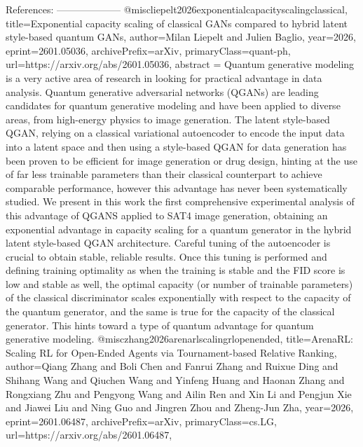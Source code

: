         References:
        --------------------
        @misc{liepelt2026exponentialcapacityscalingclassical,
      title={Exponential capacity scaling of classical GANs compared to hybrid latent style-based quantum GANs}, 
      author={Milan Liepelt and Julien Baglio},
      year={2026},
      eprint={2601.05036},
      archivePrefix={arXiv},
      primaryClass={quant-ph},
      url={https://arxiv.org/abs/2601.05036},
      abstract = {Quantum generative modeling is a very active area of research in looking for practical advantage in data analysis. Quantum generative adversarial networks (QGANs) are leading candidates for quantum generative modeling and have been applied to diverse areas, from high-energy physics to image generation. The latent style-based QGAN, relying on a classical variational autoencoder to encode the input data into a latent space and then using a style-based QGAN for data generation has been proven to be efficient for image generation or drug design, hinting at the use of far less trainable parameters than their classical counterpart to achieve comparable performance, however this advantage has never been systematically studied. We present in this work the first comprehensive experimental analysis of this advantage of QGANS applied to SAT4 image generation, obtaining an exponential advantage in capacity scaling for a quantum generator in the hybrid latent style-based QGAN architecture. Careful tuning of the autoencoder is crucial to obtain stable, reliable results. Once this tuning is performed and defining training optimality as when the training is stable and the FID score is low and stable as well, the optimal capacity (or number of trainable parameters) of the classical discriminator scales exponentially with respect to the capacity of the quantum generator, and the same is true for the capacity of the classical generator. This hints toward a type of quantum advantage for quantum generative modeling.}
}@misc{zhang2026arenarlscalingrlopenended,
      title={ArenaRL: Scaling RL for Open-Ended Agents via Tournament-based Relative Ranking}, 
      author={Qiang Zhang and Boli Chen and Fanrui Zhang and Ruixue Ding and Shihang Wang and Qiuchen Wang and Yinfeng Huang and Haonan Zhang and Rongxiang Zhu and Pengyong Wang and Ailin Ren and Xin Li and Pengjun Xie and Jiawei Liu and Ning Guo and Jingren Zhou and Zheng-Jun Zha},
      year={2026},
      eprint={2601.06487},
      archivePrefix={arXiv},
      primaryClass={cs.LG},
      url={https://arxiv.org/abs/2601.06487},
}
